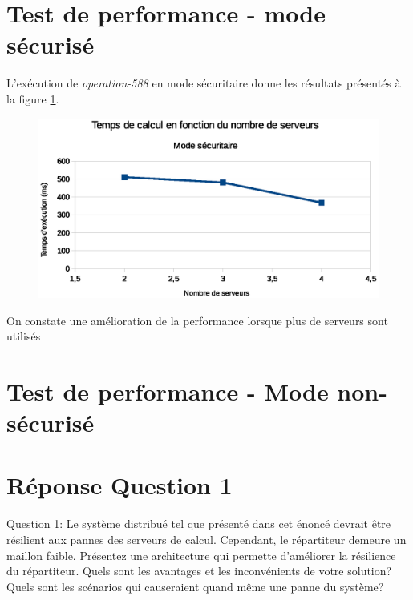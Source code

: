 \section{Test de performance - mode sécurisé}
L'exécution de \emph{operation-588} en mode sécuritaire donne les résultats présentés à la figure \ref{fig:safe}.

\begin{figure}
  \includegraphics[width=\linewidth]{safe_exec.eps}
  \label{fig:safe}
\end{figure}

On constate une amélioration de la performance lorsque plus de serveurs sont utilisés

\section{Test de performance - Mode non-sécurisé}

\section{Réponse Question 1}
Question 1: Le système distribué tel que présenté dans cet énoncé devrait être résilient aux pannes
des serveurs de calcul. Cependant, le répartiteur demeure un maillon faible. Présentez une
architecture qui permette d'améliorer la résilience du répartiteur. Quels sont les avantages et les
inconvénients de votre solution? Quels sont les scénarios qui causeraient quand même une panne du
système?

